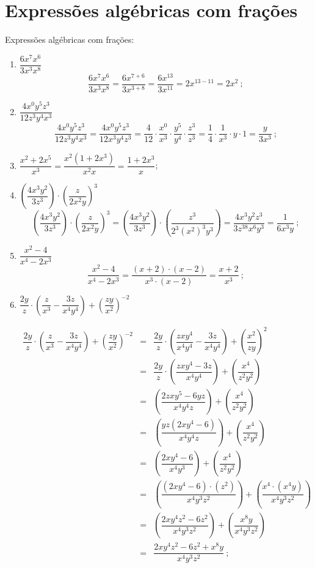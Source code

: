  
 \section{Expressões algébricas com frações}
 
 \begin{exem} Expressões algébricas com frações:
 \begin{enumerate}    
  \item $\dfrac{6x^7 x^6}{3x^3x^8}$
  \[\dfrac{6x^7 x^6}{3x^3x^8}= \dfrac{6x^{7+6}}{3x^{3+8}}= \dfrac{6x^{13}}{3x^{11}}= 2x^{13-11}= 2x^2 \ ;\]
 
  \item $\dfrac{4x^0y^5z^3}{12z^3y^4x^3}$
  \[\dfrac{4x^0y^5z^3}{12z^3y^4x^3}= \dfrac{4x^0y^5z^3}{12x^3y^4z^3}= \dfrac{4}{12} \cdot \dfrac{x^0}{x^3} \cdot \dfrac{y^5}{y^4} \cdot \dfrac{z^3}{z^3}= \dfrac{1}{4} \cdot \dfrac{1}{x^3} \cdot y \cdot 1=\dfrac{y}{3x^3} \ ;\]
  
  \item $\dfrac{x^2+2x^5}{x^3}= \dfrac{x^2(1+2x^3)}{x^2 x}= \dfrac{1+2x^3}{x}$;

  
  \item $\left(\dfrac{4x^3y^2}{3z^3}\right) \cdot \left(\dfrac{z}{2x^2y} \right)^3$
  \[\left(\dfrac{4x^3y^2}{3z^3}\right) \cdot \left(\dfrac{z}{2x^2y} \right)^3 = \left(\dfrac{4x^3y^2}{3z^3}\right) \cdot \left(\dfrac{z^3}{2^3(x^2)^3y^3} \right)= \dfrac{4x^3y^2z^3}{3z^38x^6y^3}= \dfrac{1}{6x^3y} \ ;\]
  
  \item $\dfrac{x^2 - 4}{x^4 - 2x^3}$
  \[\dfrac{x^2 - 4}{x^4 - 2x^3}= \dfrac{(x+2) \cdot (x-2)}{x^3 \cdot (x - 2)}= \dfrac{x+2}{x^3} \ ; \]
  
  \item $\dfrac{2y}{z} \cdot \left( \dfrac{z}{x^3} - \dfrac{3z}{x^4y^4} \right) + \left( \dfrac{zy}{x^2} \right)^{-2}$
  
  \begin{eqnarray*}
   \dfrac{2y}{z} \cdot \left( \dfrac{z}{x^3} - \dfrac{3z}{x^4y^4} \right) + \left( \dfrac{zy}{x^2} \right)^{-2} 
   &=& \dfrac{2y}{z} \cdot \left( \dfrac{zxy^4}{x^4y^4} - \dfrac{3z}{x^4y^4} \right) + \left( \dfrac{x^2}{zy} \right)^{2} \\
   &=& \dfrac{2y}{z} \cdot \left( \dfrac{zxy^4 - 3z}{x^4y^4} \right) + \left( \dfrac{x^4}{z^2y^2} \right) \\
   &=& \left( \dfrac{2zxy^5 - 6yz}{x^4y^4z} \right) + \left( \dfrac{x^4}{z^2y^2} \right) \\
   &=& \left( \dfrac{yz(2xy^4 - 6)}{x^4y^4z} \right) + \left( \dfrac{x^4}{z^2y^2} \right) \\
   &=& \left( \dfrac{2xy^4 - 6}{x^4y^3} \right) + \left( \dfrac{x^4}{z^2y^2} \right) \\
   &=& \left( \dfrac{(2xy^4 - 6) \cdot (z^2)}{x^4y^3z^2} \right) + \left( \dfrac{x^4 \cdot (x^4y)}{x^4y^3z^2} \right) \\
   &=& \left( \dfrac{2xy^4z^2 - 6z^2}{x^4y^3z^2} \right) + \left( \dfrac{x^8y}{x^4y^3z^2} \right) \\
   &=& \dfrac{2xy^4z^2 - 6z^2 + x^8y}{x^4y^3z^2} \ ;
  \end{eqnarray*}


\end{enumerate}
\end{exem}
